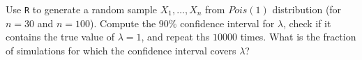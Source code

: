 
\begin{exercise}

Use \texttt R to generate a random sample $X_1, \dots, X_n$ from $\mathit{Pois}(1)$ distribution (for $n = 30$ and $n = 100$).
Compute the $90 \%$ confidence interval for $\lambda$, check if it contains the true value of $\lambda = 1$, and repeat ths $10 000$ times.
What is the fraction of simulations for which the confidence interval covers $\lambda$?

\end{exercise}


\begin{solution}

\phantom{}

\end{solution}

